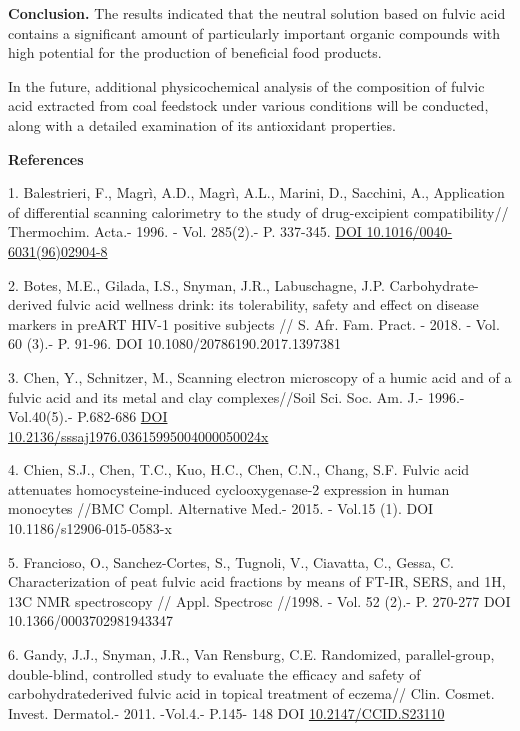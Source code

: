 \begin{multicols}{2}
{\bfseries Conclusion.} The results indicated that the neutral solution
based on fulvic acid contains a significant amount of particularly
important organic compounds with high potential for the production of
beneficial food products.

In the future, additional physicochemical analysis of the composition of
fulvic acid extracted from coal feedstock under various conditions will
be conducted, along with a detailed examination of its antioxidant
properties.
\end{multicols}

\begin{center}
{\bfseries References}
\end{center}

\begin{references}
1. Balestrieri, F., Magrì, A.D., Magrì, A.L., Marini, D., Sacchini, A.,
Application of differential scanning calorimetry to the study of
drug-excipient compatibility// Thermochim. Acta.- 1996. - Vol. 285(2).-
P. 337-345. \href{https://doi.org/10.1016/0040-6031(96)02904-8}{DOI
10.1016/0040-6031(96)02904-8}

2. Botes, M.E., Gilada, I.S., Snyman, J.R., Labuschagne, J.P.
Carbohydrate-derived fulvic acid wellness drink: its tolerability,
safety and effect on disease markers in preART HIV-1 positive subjects
// S. Afr. Fam. Pract. - 2018. - Vol. 60 (3).- P. 91-96.
DOI 10.1080/20786190.2017.1397381

3. Chen, Y., Schnitzer, M., Scanning electron microscopy of a humic acid
and of a fulvic acid and its metal and clay complexes//Soil Sci. Soc.
Am. J.- 1996.-Vol.40(5).- P.682-686
\href{https://doi.org/10.2136/sssaj1976.03615995004000050024x}{DOI\\
10.2136/sssaj1976.03615995004000050024x}

4. Chien, S.J., Chen, T.C., Kuo, H.C., Chen, C.N., Chang, S.F. Fulvic
acid attenuates homocysteine-induced cyclooxygenase-2 expression in
human monocytes //BMC Compl. Alternative Med.- 2015. - Vol.15 (1). DOI
10.1186/s12906-015-0583-x

5. Francioso, O., Sanchez-Cortes, S., Tugnoli, V., Ciavatta, C., Gessa,
C. Characterization of peat fulvic acid fractions by means of FT-IR,
SERS, and 1H, 13C NMR spectroscopy // Appl. Spectrosc //1998. - Vol. 52
(2).- P. 270-277 DOI 10.1366/0003702981943347

6. Gandy, J.J., Snyman, J.R., Van Rensburg, C.E. Randomized,
parallel-group, double-blind, controlled study to evaluate the efficacy
and safety of carbohydratederived fulvic acid in topical treatment of
eczema// Clin. Cosmet. Invest. Dermatol.- 2011. -Vol.4.- P.145- 148
DOI \href{https://doi.org/10.2147/ccid.s23110}{10.2147/CCID.S23110}


\end{references}
